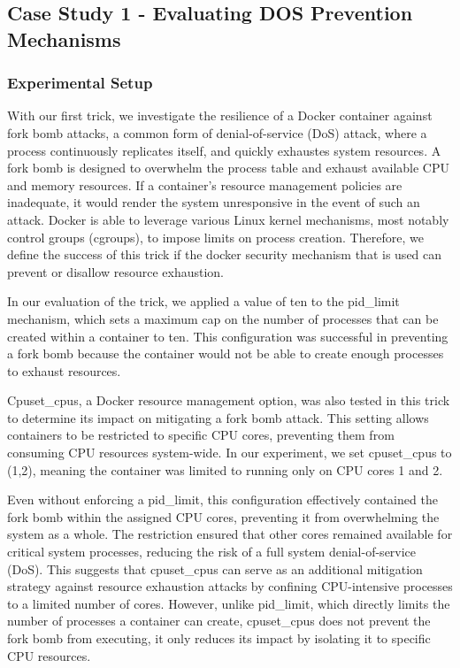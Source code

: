 \subsection{Case Study 1 - Evaluating DOS Prevention Mechanisms}

\subsubsection{Experimental Setup}

With our first trick, we investigate the resilience of a Docker container against fork bomb attacks, a common form of denial-of-service (DoS) attack, where a process continuously replicates itself, and quickly exhaustes system resources. A fork bomb is designed to overwhelm the process table and exhaust available CPU and memory resources. If a container's resource management policies are inadequate, it would render the system unresponsive in the event of such an attack. Docker is able to leverage various Linux kernel mechanisms, most notably control groups (cgroups), to impose limits on process creation. Therefore, we define the success of this trick if the docker security mechanism that is used can prevent or disallow resource exhaustion. 

In our evaluation of the trick, we applied a value of ten to the pid\_limit mechanism, which sets a maximum cap on the number of processes that can be created within a container to ten. This configuration was successful in preventing a fork bomb because the container would not be able to create enough processes to exhaust resources.

Cpuset\_cpus, a Docker resource management option, was also tested in this trick to determine its impact on mitigating a fork bomb attack. This setting allows containers to be restricted to specific CPU cores, preventing them from consuming CPU resources system-wide. In our experiment, we set cpuset\_cpus to (1,2), meaning the container was limited to running only on CPU cores 1 and 2.

Even without enforcing a pid\_limit, this configuration effectively contained the fork bomb within the assigned CPU cores, preventing it from overwhelming the system as a whole. The restriction ensured that other cores remained available for critical system processes, reducing the risk of a full system denial-of-service (DoS). This suggests that cpuset\_cpus can serve as an additional mitigation strategy against resource exhaustion attacks by confining CPU-intensive processes to a limited number of cores. However, unlike pid\_limit, which directly limits the number of processes a container can create, cpuset\_cpus does not prevent the fork bomb from executing, it only reduces its impact by isolating it to specific CPU resources.

